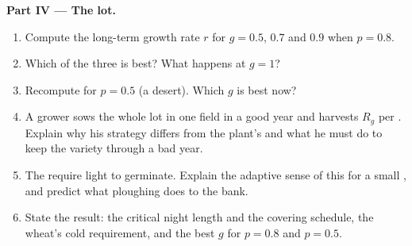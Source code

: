 \begin{problem}
\medskip
\noindent\textbf{Part IV --- The  lot.}
\begin{enumerate}[resume]
  \item Compute the long-term growth rate $r$ for $g = 0.5$, $0.7$
        and $0.9$ when $p = 0.8$.
  \item Which of the three is best? What happens at $g = 1$?
  \item Recompute for $p = 0.5$ (a desert). Which $g$ is best now?
  \item A grower sows the whole lot in one field in a good year and
        harvests $R_g$ per . Explain why his strategy differs
        from the plant's and what he must do to keep the variety
        through a bad year.
  \item The  require light to germinate. Explain the adaptive
        sense of this for a small , and predict what ploughing
        does to the  bank.
  \item State the result: the critical night length and the covering
        schedule, the wheat's cold requirement, and the best $g$ for
        $p = 0.8$ and $p = 0.5$.
\end{enumerate}
\end{problem}
